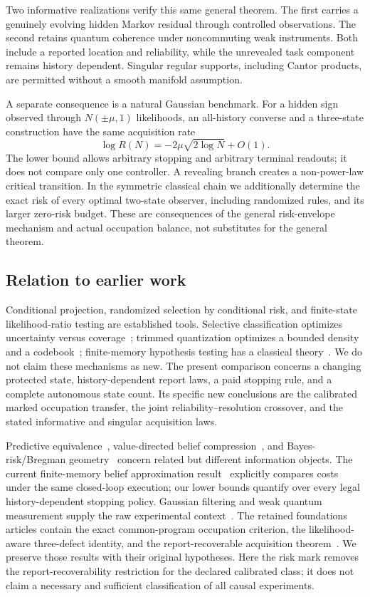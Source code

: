 Two informative realizations verify this same general theorem. The first carries a genuinely evolving hidden Markov residual through controlled observations. The second retains quantum coherence under noncommuting weak instruments. Both include a reported location and reliability, while the unrevealed task component remains history dependent. Singular regular supports, including Cantor products, are permitted without a smooth manifold assumption.

A separate consequence is a natural Gaussian benchmark. For a hidden sign observed through $N(\pm\mu,1)$ likelihoods, an all-history converse and a three-state construction have the same acquisition rate
\[
 \log R(N)=-2\mu\sqrt{2\log N}+O(1).
\]
The lower bound allows arbitrary stopping and arbitrary terminal readouts; it does not compare only one controller. A revealing branch creates a non-power-law critical transition. In the symmetric classical chain we additionally determine the exact risk of every optimal two-state observer, including randomized rules, and its larger zero-risk budget. These are consequences of the general risk-envelope mechanism and actual occupation balance, not substitutes for the general theorem.

\subsection*{Relation to earlier work}
Conditional projection, randomized selection by conditional risk, and finite-state likelihood-ratio testing are established tools. Selective classification optimizes uncertainty versus coverage~\cite{Franc}; trimmed quantization optimizes a bounded density and a codebook~\cite{CGM}; finite-memory hypothesis testing has a classical theory~\cite{HC}. We do not claim these mechanisms as new. The present comparison concerns a changing protected state, history-dependent report laws, a paid stopping rule, and a complete autonomous state count. Its specific new conclusions are the calibrated marked occupation transfer, the joint reliability--resolution crossover, and the stated informative and singular acquisition laws.

Predictive equivalence~\cite{SC}, value-directed belief compression~\cite{PB}, and Bayes-risk/Bregman geometry~\cite{Varshney} concern related but different information objects. The current finite-memory belief approximation result~\cite{Kim} explicitly compares costs under the same closed-loop execution; our lower bounds quantify over every legal history-dependent stopping policy. Gaussian filtering and weak quantum measurement supply the raw experimental context~\cite{Rabiner,Jacobs}. The retained foundations articles contain the exact common-program occupation criterion, the likelihood-aware three-defect identity, and the report-recoverable acquisition theorem~\cite{GTF49,GTF32,GTF51}. We preserve those results with their original hypotheses. Here the risk mark removes the report-recoverability restriction for the declared calibrated class; it does not claim a necessary and sufficient classification of all causal experiments.
